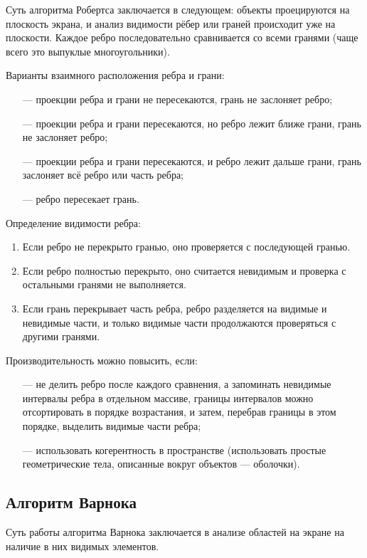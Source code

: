\begin{enumerate}
Суть алгоритма Робертса заключается в следующем: объекты проецируются на плоскость экрана, и анализ видимости рёбер или граней происходит уже на плоскости. Каждое ребро последовательно сравнивается со всеми гранями (чаще всего это выпуклые многоугольники). 

Варианты взаимного расположения ребра и грани:
\begin{itemize}
	\item[---] проекции ребра и грани не пересекаются, грань не заслоняет ребро;
	\item[---] проекции ребра и грани пересекаются, но ребро лежит ближе грани, грань не заслоняет ребро;
	\item[---] проекции ребра и грани пересекаются, и ребро лежит дальше грани, грань заслоняет всё ребро или часть ребра;
	\item[---] ребро пересекает грань. 
\end{itemize}

Определение видимости ребра:
\begin{enumerate}
	\item Если ребро не перекрыто гранью, оно проверяется с последующей гранью.
	\item Если ребро полностью перекрыто, оно считается невидимым и проверка с остальными гранями не выполняется.
	\item Если грань перекрывает часть ребра, ребро разделяется на видимые и невидимые части, и только видимые части продолжаются проверяться с другими гранями.
\end{enumerate}

Производительность можно повысить, если:
\begin{itemize} 
	\item[---] не делить ребро после каждого сравнения, а запоминать невидимые интервалы ребра в отдельном массиве, границы интервалов можно отсортировать в порядке возрастания, и затем, перебрав границы в этом порядке, выделить видимые части ребра;
	\item[---] использовать когерентность в пространстве (использовать простые геометрические тела, описанные вокруг объектов --- оболочки).
\end{itemize}

\subsection{Алгоритм Варнока}

Суть работы алгоритма Варнока заключается в анализе областей на экране на наличие в них видимых элементов.


\end{enumerate}
